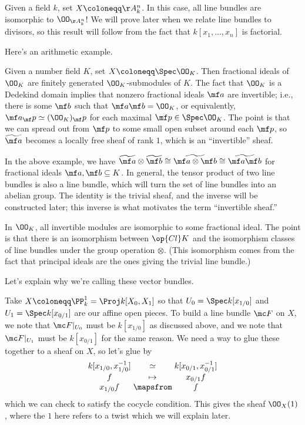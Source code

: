\documentclass[../notes.tex]{subfiles}
\begin{document}
\begin{ex}
	Given a field $k$, set $X\coloneqq\AA^n_k$. In this case, all line bundles are isomorphic to $\OO_{\AA^n_k}$! We will prove later when we relate line bundles to divisors, so this result will follow from the fact that $k[x_1,\ldots,x_n]$ is factorial.
\end{ex}
Here's an arithmetic example.
\begin{ex}
	Given a number field $K$, set $X\coloneqq\Spec\OO_K$. Then fractional ideals of $\OO_K$ are finitely generated $\OO_K$-submodules of $K$. The fact that $\OO_K$ is a Dedekind domain implies that nonzero fractional ideals $\mf a$ are invertible; i.e., there is some $\mf b$ such that $\mf a\mf b=\OO_K$, or equivalently, $\mf a_\mf p\simeq(\OO_K)_\mf p$ for each maximal $\mf p\in\Spec\OO_K$. The point is that we can spread out from $\mf p$ to some small open subset around each $\mf p$, so $\widetilde{\mf a}$ becomes a locally free sheaf of rank $1$, which is an ``invertible'' sheaf.
\end{ex}
\begin{remark}
	In the above example, we have $\widetilde{\mf a}\otimes\widetilde{\mf b}\cong\widetilde{\mf a\otimes\mf b}\cong\widetilde{\mf a\mf b}$ for fractional ideals $\mf a,\mf b\subseteq K$. In general, the tensor product of two line bundles is also a line bundle, which will turn the set of line bundles into an abelian group. The identity is the trivial sheaf, and the inverse will be constructed later; this inverse is what motivates the term ``invertible sheaf.''
\end{remark}
\begin{remark}
	In $\OO_K$, all invertible modules are isomorphic to some fractional ideal. The point is that there is an isomorphism between $\op{Cl}K$ and the isomorphism classes of line bundles under the group operation $\otimes$. (This isomorphism comes from the fact that principal ideals are the ones giving the trivial line bundle.)
\end{remark}
Let's explain why we're calling these vector bundles.
\begin{example}
	Take $X\coloneqq\PP^1_k=\Proj k[X_0,X_1]$ so that $U_0=\Spec k[x_{1/0}]$ and $U_1=\Spec k[x_{0/1}]$ are our affine open pieces. To build a line bundle $\mc F$ on $X$, we note that $\mc F|_{U_0}$ must be $k[x_{1/0}]$ as discussed above, and we note that $\mc F|_{U_1}$ must be $k[x_{0/1}]$ for the same reason. We need a way to glue these together to a sheaf on $X$, so let's glue by
	\[\arraycolsep=1.4pt\begin{array}{cccccccc}
		k[x_{1/0},x_{1/0}^{-1}] &\simeq& k[x_{0/1},x_{0/1}^{-1}] \\
		f &\mapsto& x_{0/1}f \\
		x_{1/0}f &\mapsfrom& f
	\end{array}\]
	which we can check to satisfy the cocycle condition. This gives the sheaf $\OO_X(1)$, where the $1$ here refers to a twist which we will explain later.
\end{example}
\end{document}
